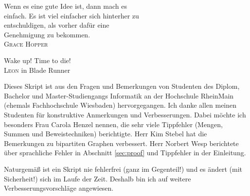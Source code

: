 \documentclass[11pt, a4paper, twoside, bibliography=totoc]{scrartcl}
\begin{document}
\vspace*{1.5cm}

\begin{raggedleft}
Wenn es eine gute Idee ist, dann mach es\\ 
einfach. Es ist viel einfacher sich hinterher zu\\
entschuldigen, als vorher dafür eine\\
Genehmigung zu bekommen.\\[\smallskipamount]
\hfill \textsc{Grace Hopper}%
\end{raggedleft}

\vspace*{1.5cm}

\begin{raggedleft}
Wake up! Time to die!\\[\smallskipamount]
\hfill \textsc{Leon} in Blade Runner%
\end{raggedleft}

\vfill

Dieses Skript ist aus den Fragen und Bemerkungen von Studenten des
Diplom, Bachelor und Master-Studiengangs Informatik an der Hochschule
RheinMain (ehemals Fachhochschule Wiesbaden) hervorgegangen. Ich danke
allen meinen Studenten für konstruktive Anmerkungen und
Verbesserungen. Dabei möchte ich besonders Frau Carola Henzel nennen,
die sehr viele Tippfehler (Mengen, Summen und Beweistechniken)
berichtigte. Herr Kim Stebel hat die Bemerkungen zu bipartiten Graphen
verbessert. Herr Norbert Wesp berichtete über sprachliche Fehler in
Abschnitt \ref{sec:proof} und Tippfehler in der Einleitung. 

Naturgemäß ist ein Skript nie fehlerfrei (ganz im Gegenteil!) und es
ändert (mit Sicherheit!) sich im Laufe der Zeit. Deshalb bin ich auf
weitere Verbesserungsvorschläge angewiesen.

\cleardoublepage

\tableofcontents

\cleardoublepage

\pagestyle{scrheadings}

	



\cleardoublepage


\end{document}
